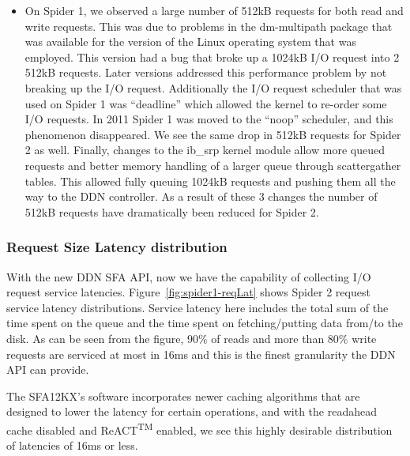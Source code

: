 \begin{itemize}
\item   On Spider 1, we observed a large number of 512kB requests for both read
and write requests. This was due to problems in the dm-multipath \cite{mpath}
package that was available for the version of the Linux operating system that
was employed. This version had a bug that broke up a 1024kB I/O request into 2
512kB requests. Later versions addressed this performance problem by not
breaking up the I/O request. Additionally the I/O request scheduler that was
used on Spider 1 was ``deadline'' which allowed the kernel to re-order some I/O
requests.  In 2011 Spider 1 was moved to the ``noop'' scheduler, and this
phenomenon disappeared. We see the same drop in 512kB requests for Spider 2 as
well. Finally, changes to the ib\_srp kernel module allow more queued requests
and better memory handling of a larger queue through scatter\/gather tables.
This allowed fully queuing 1024kB requests and pushing them all the way to the
DDN controller. As a result of these 3 changes the number of 512kB requests
have dramatically been reduced for Spider 2.  \end{itemize}

\subsubsection{Request Size Latency distribution}

With the new DDN SFA API, now we have the capability of collecting I/O request
service latencies. Figure~\ref{fig:spider1-reqLat} shows Spider 2 request
service latency distributions. Service latency here includes the total sum of
the time spent on the queue and the time spent on fetching/putting data from/to
the disk. As can be seen from the figure, 90\% of reads and more than 80\%
write requests are serviced at most in 16ms and this is the finest granularity
the DDN API can provide. 

The SFA12KX's software incorporates newer caching algorithms that are designed
to lower the latency for certain operations, and with the readahead cache
disabled and ReACT\textsuperscript{TM} enabled, we see this highly desirable
distribution of latencies of 16ms or less.


